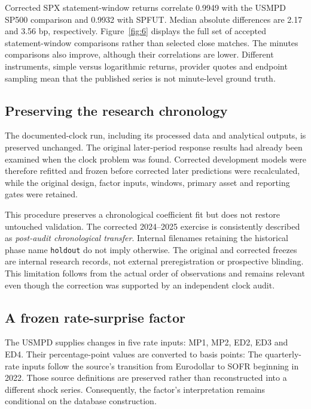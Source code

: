 
Corrected SPX statement-window returns correlate 0.9949 with the USMPD SP500 comparison and 0.9932 with SPFUT. Median absolute differences are 2.17 and 3.56 bp, respectively. Figure~\ref{fig:6} displays the full set of accepted statement-window comparisons rather than selected close matches. The minutes comparisons also improve, although their correlations are lower. Different instruments, simple versus logarithmic returns, provider quotes and endpoint sampling mean that the published series is not minute-level ground truth.


\subsection{Preserving the research chronology}
The documented-clock run, including its processed data and analytical outputs, is preserved unchanged. The original later-period response results had already been examined when the clock problem was found. Corrected development models were therefore refitted and frozen before corrected later predictions were recalculated, while the original design, factor inputs, windows, primary asset and reporting gates were retained.

This procedure preserves a chronological coefficient fit but does not restore untouched validation. The corrected 2024--2025 exercise is consistently described as \textit{post-audit chronological transfer}. Internal filenames retaining the historical phase name \texttt{holdout} do not imply otherwise. The original and corrected freezes are internal research records, not external preregistration or prospective blinding. This limitation follows from the actual order of observations and remains relevant even though the correction was supported by an independent clock audit.

\label{sec:methods}
\subsection{A frozen rate-surprise factor}
The USMPD supplies changes in five rate inputs: MP1, MP2, ED2, ED3 and ED4. Their percentage-point values are converted to basis points:
The quarterly-rate inputs follow the source's transition from Eurodollar to SOFR beginning in 2022. Those source definitions are preserved rather than reconstructed into a different shock series. Consequently, the factor's interpretation remains conditional on the database construction.

